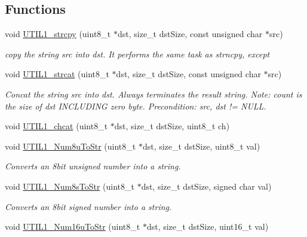 \subsection*{Functions}
\begin{DoxyCompactItemize}
\item 
void \hyperlink{group___u_t_i_l1__module_ga05eaa0c70134ec4c75b50e415470636b}{U\+T\+I\+L1\+\_\+strcpy} (uint8\+\_\+t $\ast$dst, size\+\_\+t dst\+Size, const unsigned char $\ast$src)
\begin{DoxyCompactList}\small\item\em copy the string src into dst. It performs the same task as strncpy, except \end{DoxyCompactList}\item 
void \hyperlink{group___u_t_i_l1__module_ga08c23f0fce3b1fc9c3bfbb7397f71a5a}{U\+T\+I\+L1\+\_\+strcat} (uint8\+\_\+t $\ast$dst, size\+\_\+t dst\+Size, const unsigned char $\ast$src)
\begin{DoxyCompactList}\small\item\em Concat the string src into dst. Always terminates the result string. Note\+: count is the size of dst I\+N\+C\+L\+U\+D\+I\+NG zero byte. Precondition\+: src, dst != N\+U\+LL. \end{DoxyCompactList}\item 
void \hyperlink{group___u_t_i_l1__module_gaa96f26f21ce129ee31e1b1c0a36a9676}{U\+T\+I\+L1\+\_\+chcat} (uint8\+\_\+t $\ast$dst, size\+\_\+t dst\+Size, uint8\+\_\+t ch)
\item 
void \hyperlink{group___u_t_i_l1__module_gab5dfed20066315231d87809500f32f1d}{U\+T\+I\+L1\+\_\+\+Num8u\+To\+Str} (uint8\+\_\+t $\ast$dst, size\+\_\+t dst\+Size, uint8\+\_\+t val)
\begin{DoxyCompactList}\small\item\em Converts an 8bit unsigned number into a string. \end{DoxyCompactList}\item 
void \hyperlink{group___u_t_i_l1__module_gaa751000f1fb28af773078ac27fba72fb}{U\+T\+I\+L1\+\_\+\+Num8s\+To\+Str} (uint8\+\_\+t $\ast$dst, size\+\_\+t dst\+Size, signed char val)
\begin{DoxyCompactList}\small\item\em Converts an 8bit signed number into a string. \end{DoxyCompactList}\item 
void \hyperlink{group___u_t_i_l1__module_ga2617b1bd9c2be5275d058692ecad2e2f}{U\+T\+I\+L1\+\_\+\+Num16u\+To\+Str} (uint8\+\_\+t $\ast$dst, size\+\_\+t dst\+Size, uint16\+\_\+t val)

\end{DoxyCompactItemize}
